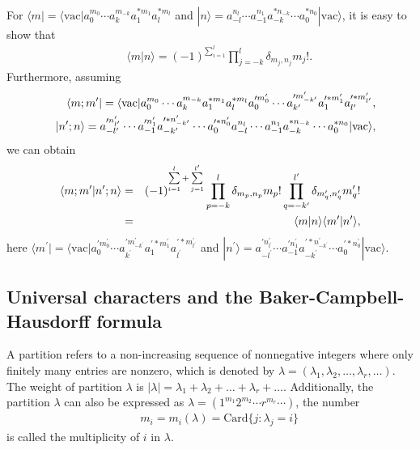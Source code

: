 \documentclass[11pt,reqno]{amsart}
\numberwithin{equation}{section}
\begin{document}
For $\langle m|=\langle\text{vac}|a^{m_{0}}_{0}\cdots a^{m_{-k}}_{k}a^{\ast m_{1}}_{1}a^{\ast m_{l}}_{l}$ and $|n\rangle=a^{n_{l}}_{-l}\cdots a^{n_{1}}_{-1}a^{\ast n_{-k}}_{-k}\cdots a^{\ast n_{0}}_{0}|\text{vac}\rangle$, it is easy to show that
\begin{eqnarray}
&&\langle m|n\rangle=(-1)^{\sum\limits^{l}_{i=1}}\prod\limits^{l}_{j=-k}\delta_{m_{j},n_{j}}m_{j}!.
\end{eqnarray}
Furthermore, assuming
\begin{eqnarray}
&&\langle m;m^{\prime}|=\langle\text{vac}|a^{m_{0}}_{0}\cdots a^{m_{-k}}_{k}a^{\ast m_{1}}_{1}a^{\ast m_{l}}_{l}a^{\prime m^{\prime}_{0}}_{0}\cdots a^{\prime m^{\prime}_{-k^{\prime}}}_{k^{\prime}}a^{\prime\ast m^{\prime}_{1}}_{1}a^{\prime\ast m^{\prime}_{l^{\prime}}}_{l^{\prime}},\notag\\
&&|n^{\prime};n\rangle=a^{\prime n^{\prime}_{l^{\prime}}}_{-l^{\prime}}\cdots a^{\prime n^{\prime}_{1}}_{-1}a^{\prime \ast n^{\prime}_{-k^{\prime}}}_{-k^{\prime}}\cdots a^{\prime \ast n^{\prime
}_{0}}_{0}a^{n_{l}}_{-l}\cdots a^{n_{1}}_{-1}a^{\ast n_{-k}}_{-k}\cdots a^{\ast n_{0}}_{0}|\text{vac}\rangle,
\end{eqnarray}
 we can obtain
\begin{eqnarray}\label{double_product}
\langle m;m^{\prime}|n^{\prime};n\rangle&=&(-1)^{\sum\limits^{l}_{i=1}+\sum\limits^{l^{\prime}}_{j=1}}
\prod\limits^{l}_{p=-k}\delta_{m_{p},n_{p}}m_{p}!\prod\limits^{l^{\prime}}_{q=-k^{\prime}}
\delta_{m^{\prime}_{q},n^{\prime}_{q}}m^{\prime}_{q}!\notag\\
&=&\langle m|n\rangle\langle m^{\prime}|n^{\prime}\rangle,
\end{eqnarray}
here $\langle m^{\prime}|=\langle\text{vac}|a^{\prime m^{\prime}_{0}}_{0}\cdots a^{\prime m^{\prime}_{-k^{\prime}}}_{k^{\prime}}a^{\prime\ast m^{\prime}_{1}}_{1}a^{\prime\ast m^{\prime}_{l^{\prime}}}_{l^{\prime}}$ and $|n^{\prime}\rangle=a^{\prime n^{\prime}_{l^{\prime}}}_{-l^{\prime}}\cdots a^{\prime n^{\prime}_{1}}_{-1}a^{\prime \ast n^{\prime}_{-k^{\prime}}}_{-k^{\prime}}\cdots a^{\prime \ast n^{\prime}_{0}}_{0}|\text{vac}\rangle$.



\subsection{Universal characters and the Baker-Campbell-Hausdorff  formula}
A partition refers to a non-increasing sequence of nonnegative integers where only finitely many entries are nonzero, which is denoted by $\lambda=(\lambda_1, \lambda_2, \ldots, \lambda_r, \ldots)$. The weight of partition $\lambda$ is   $|\lambda|=\lambda_1+\lambda_2+\ldots+\lambda_r+\ldots$. Additionally, the partition $\lambda$ can also be expressed  as $\lambda=(1^{m_{1}}2^{m_{2}}\cdots r^{m_{r}}\cdots)$, the number
\begin{eqnarray}
&&m_{i}=m_{i}(\lambda)=\text{Card}\{j:\lambda_{j}=i\}
\end{eqnarray}
is called the multiplicity of $i$ in $\lambda$.
\end{document}
